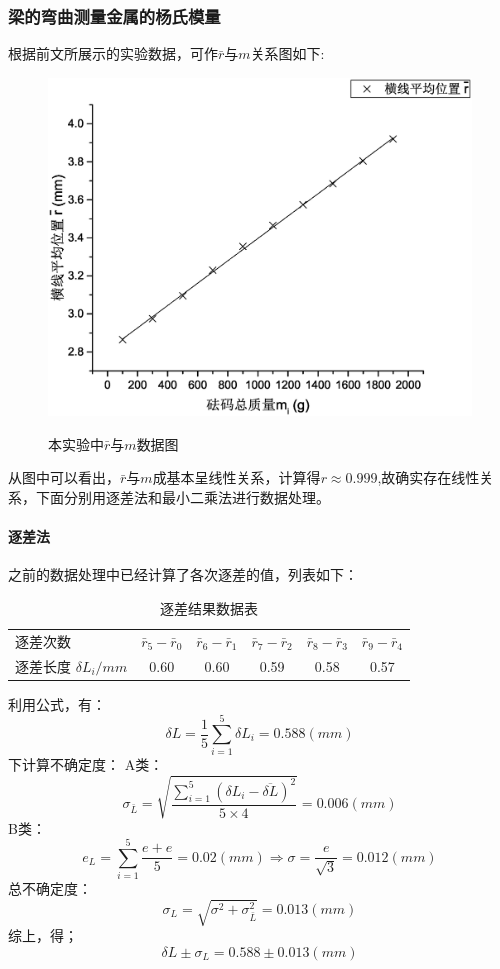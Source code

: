 \documentclass{ctexart}
\begin{document}
\subsubsection{梁的弯曲测量金属的杨氏模量}
根据前文所展示的实验数据，可作$\bar{r}$与$m$关系图如下:
\begin{figure}[H]
  \centering
  \caption{本实验中$\bar{r}$与$m$数据图}
  \includegraphics[width=\textwidth]{1}
  \label{fig:digit}
\end{figure}
从图中可以看出，$\bar{r}$与$m$成基本呈线性关系，计算得$r\approx 0.999$,故确实存在线性关系，下面分别用逐差法和最小二乘法进行数据处理。
\paragraph{逐差法}之前的数据处理中已经计算了各次逐差的值，列表如下：
\begin{table}[H]
  \centering
  \caption{逐差结果数据表}
    \begin{tabular}{lccccc}
    逐差次数  & \multicolumn{1}{l}{$\bar{r}_5-\bar{r}_0$} & \multicolumn{1}{l}{$\bar{r}_6-\bar{r}_1$} & \multicolumn{1}{l}{$\bar{r}_7-\bar{r}_2$} & \multicolumn{1}{l}{$\bar{r}_8-\bar{r}_3$} & \multicolumn{1}{l}{$\bar{r}_9-\bar{r}_4$} \\
    逐差长度 $\delta L_i/mm$ & 0.60  & 0.60  & 0.59  & 0.58  & 0.57  \\
    \end{tabular}%
  \label{tab:addlabel}%
\end{table}%
利用公式，有：
$$\delta L=\frac{1}5 \sum_{i=1}^5{\delta L_i}=0.588(mm)$$
下计算不确定度：
A类：$$\sigma_{\bar{L}}=\sqrt{\frac{\sum\limits_{i=1}^5{(\delta L_i-\overline{\delta L})^2}}{5\times4}}=0.006(mm)$$
B类：$$e_L=\sum\limits_{i=1}^5{\frac{e+e}5}=0.02(mm)\Rightarrow \sigma=\frac{e}{\sqrt{3}}=0.012(mm)$$
总不确定度：$$\sigma_L=\sqrt{\sigma^2+\sigma_{\bar{L}}^2}=0.013(mm)$$
综上，得；$$\delta L\pm \sigma_L=0.588\pm 0.013(mm)$$
\end{document}

